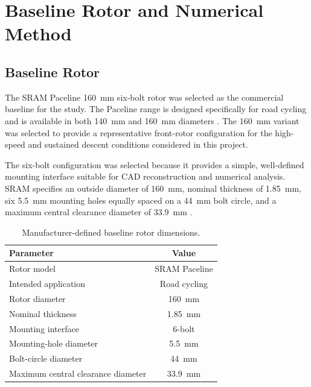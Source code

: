 \documentclass[11pt,a4paper]{article}
\begin{document}
\section{Baseline Rotor and Numerical Method}

\subsection{Baseline Rotor}

The SRAM Paceline 160~mm six-bolt rotor was selected as the commercial
baseline for the study. The Paceline range is designed specifically for road
cycling and is available in both 140~mm and 160~mm diameters
\cite{SRAMPaceline}. The 160~mm variant was selected to provide a
representative front-rotor configuration for the high-speed and sustained
descent conditions considered in this project.

The six-bolt configuration was selected because it provides a simple,
well-defined mounting interface suitable for CAD reconstruction and numerical
analysis. SRAM specifies an outside diameter of \SI{160}{mm}, nominal
thickness of \SI{1.85}{mm}, six \SI{5.5}{mm} mounting holes equally spaced
on a \SI{44}{mm} bolt circle, and a maximum central clearance diameter of
\SI{33.9}{mm} \cite{SRAMRoadFrameFit}.

\begin{table}[H]
    \centering
    \caption{Manufacturer-defined baseline rotor dimensions.}
    \label{tab:baseline_rotor}
    \begin{tabular}{l c}
        \toprule
        Parameter & Value \\
        \midrule
        Rotor model & SRAM Paceline \\
        Intended application & Road cycling \\
        Rotor diameter & \SI{160}{mm} \\
        Nominal thickness & \SI{1.85}{mm} \\
        Mounting interface & 6-bolt \\
        Mounting-hole diameter & \SI{5.5}{mm} \\
        Bolt-circle diameter & \SI{44}{mm} \\
        Maximum central clearance diameter & \SI{33.9}{mm} \\
        \bottomrule
    \end{tabular}
\end{table}
\end{document}
